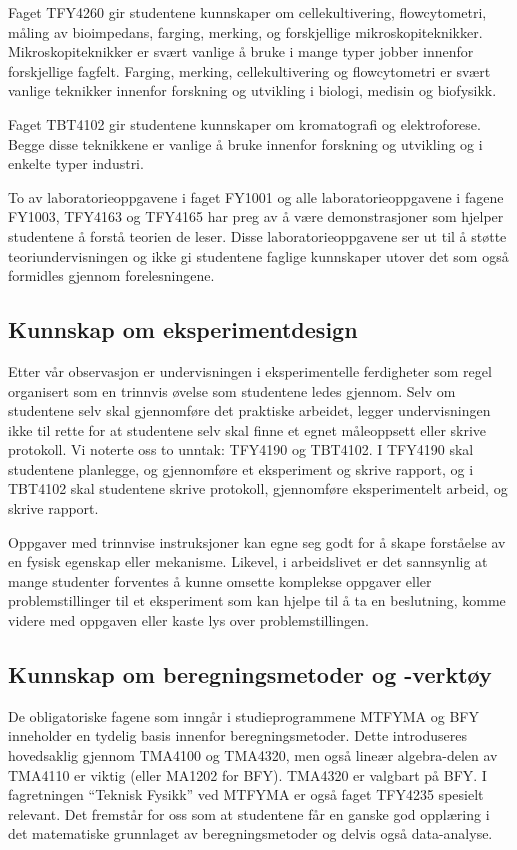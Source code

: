 \documentclass{article}
\begin{document}
Faget TFY4260 gir studentene kunnskaper om cellekultivering, flowcytometri, måling av bioimpedans, farging, merking, og forskjellige mikroskopiteknikker. Mikroskopiteknikker er svært vanlige å bruke i mange typer jobber innenfor forskjellige fagfelt. Farging, merking, cellekultivering og flowcytometri er svært vanlige teknikker innenfor forskning og utvikling i biologi, medisin og biofysikk.

Faget TBT4102 gir studentene kunnskaper om kromatografi og elektroforese. Begge disse teknikkene er vanlige å bruke innenfor forskning og utvikling og i enkelte typer industri.

To av laboratorieoppgavene i faget FY1001 og alle laboratorieoppgavene i fagene FY1003, TFY4163 og TFY4165 har preg av å være demonstrasjoner som hjelper studentene å forstå teorien de leser. Disse laboratorieoppgavene ser ut til å støtte teoriundervisningen og ikke gi studentene faglige kunnskaper utover det som også formidles gjennom forelesningene.

\subsection{Kunnskap om eksperimentdesign}
Etter vår observasjon er undervisningen i eksperimentelle ferdigheter som regel organisert som en trinnvis øvelse som studentene ledes gjennom. Selv om studentene selv skal gjennomføre det praktiske arbeidet, legger undervisningen ikke til rette for at studentene selv skal finne et egnet måleoppsett eller skrive protokoll. Vi noterte oss to unntak: TFY4190 og TBT4102. I TFY4190 skal studentene planlegge, og gjennomføre et eksperiment og skrive rapport, og i TBT4102 skal studentene skrive protokoll, gjennomføre eksperimentelt arbeid, og skrive rapport.

Oppgaver med trinnvise instruksjoner kan egne seg godt for å skape forståelse av en fysisk egenskap eller mekanisme. Likevel, i arbeidslivet er det sannsynlig at mange studenter forventes å kunne omsette komplekse oppgaver eller problemstillinger til et eksperiment som kan hjelpe til å ta en beslutning, komme videre med oppgaven eller kaste lys over problemstillingen.

\subsection{Kunnskap om beregningsmetoder og -verktøy}
De obligatoriske fagene som inngår i studieprogrammene MTFYMA og BFY inneholder en tydelig basis innenfor beregningsmetoder. Dette introduseres hovedsaklig gjennom TMA4100 og TMA4320, men også lineær algebra-delen av TMA4110 er viktig (eller MA1202 for BFY). TMA4320 er valgbart på BFY. I fagretningen ``Teknisk Fysikk'' ved MTFYMA er også faget TFY4235 spesielt relevant. Det fremstår for oss som at studentene får en ganske god opplæring i det matematiske grunnlaget av beregningsmetoder og delvis også data-analyse.
\end{document}
